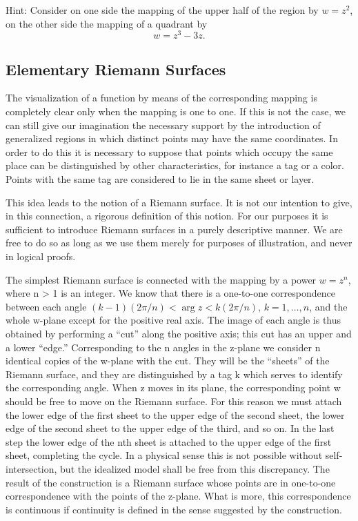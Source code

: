 Hint: Consider on one side the mapping of the upper half of the region by $w = z^{2}$, on the other side the mapping of a quadrant by
\begin{equation*}
w = z ^ {3} - 3 z.
\end{equation*}
\setcounter{section}{4}\setcounter{subsection}{2}\subsection{Elementary Riemann Surfaces}\label{sec:3.4.3}
The visualization of a function by means of the corresponding mapping is completely clear only when the mapping is one to one. If this is not the case, we can still give our imagination the necessary support by the introduction of generalized regions in which distinct points may have the same coordinates. In order to do this it is necessary to suppose that points which occupy the same place can be distinguished by other characteristics, for instance a tag or a color. Points with the same tag are considered to lie in the same sheet or layer.

This idea leads to the notion of a Riemann surface. It is not our intention to give, in this connection, a rigorous definition of this notion. For our purposes it is sufficient to introduce Riemann surfaces in a purely descriptive manner. We are free to do so as long as we use them merely for purposes of illustration, and never in logical proofs.

The simplest Riemann surface is connected with the mapping by a power $w = z^{n}$, where n > 1 is an integer. We know that there is a one-to-one correspondence between each angle $(k - 1)(2\pi/n) < \arg z < k(2\pi/n)$, $k = 1, \ldots, n$, and the whole w-plane except for the positive real axis. The image of each angle is thus obtained by performing a “cut” along the positive axis; this cut has an upper and a lower “edge.” Corresponding to the n angles in the z-plane we consider n identical copies of the w-plane with the cut. They will be the “sheets” of the Riemann surface, and they are distinguished by a tag k which serves to identify the corresponding angle. When z moves in its plane, the corresponding
point w should be free to move on the Riemann surface. For this reason we must attach the lower edge of the first sheet to the upper edge of the second sheet, the lower edge of the second sheet to the upper edge of the third, and so on. In the last step the lower edge of the nth sheet is attached to the upper edge of the first sheet, completing the cycle. In a physical sense this is not possible without self-intersection, but the idealized model shall be free from this discrepancy. The result of the construction is a Riemann surface whose points are in one-to-one correspondence with the points of the z-plane. What is more, this correspondence is continuous if continuity is defined in the sense suggested by the construction.


